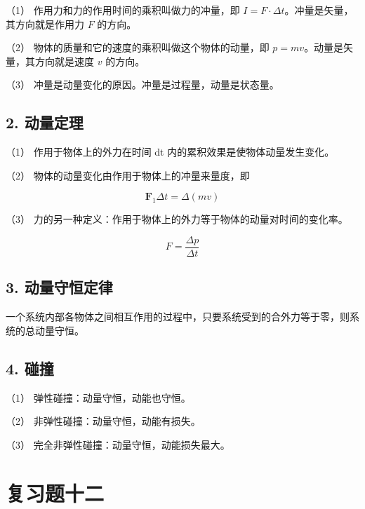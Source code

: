 （1） 作用力和力的作用时间的乘积叫做力的冲量，即
\(I = F \cdot \Delta t\)。冲量是矢量，其方向就是作用力 \(F\) 的方向。

（2） 物体的质量和它的速度的乘积叫做这个物体的动量，即
\(p = mv\)。动量是矢量，其方向就是速度 \(v\) 的方向。

（3） 冲量是动量变化的原因。冲量是过程量，动量是状态量。

\subsection{2. 动量定理}\label{ux52a8ux91cfux5b9aux7406-1}

（1） 作用于物体上的外力在时间 dt 内的累积效果是使物体动量发生变化。

（2） 物体的动量变化由作用于物体上的冲量来量度，即

\[
\boldsymbol {F} _ {1} \Delta t = \Delta (m v)
\]

（3） 力的另一种定义：作用于物体上的外力等于物体的动量对时间的变化率。

\[
F = \frac {\Delta p}{\Delta t}
\]

\subsection{3. 动量守恒定律}\label{ux52a8ux91cfux5b88ux6052ux5b9aux5f8b}

一个系统内部各物体之间相互作用的过程中，只要系统受到的合外力等于零，则系统的总动量守恒。

\subsection{4. 碰撞}\label{ux78b0ux649e}

（1） 弹性碰撞：动量守恒，动能也守恒。

（2） 非弹性碰撞：动量守恒，动能有损失。

（3） 完全非弹性碰撞：动量守恒，动能损失最大。

\section{复习题十二}\label{ux590dux4e60ux9898ux5341ux4e8c}

